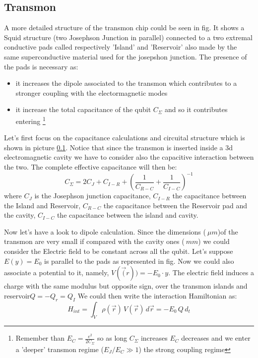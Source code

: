 \subsection{Transmon}
A more detailed structure of the transmon chip could be seen in fig. 
It shows a Squid structure (two Josephson Junction in parallel) connected to a two extremal conductive pads called respectively 'Island' and 'Reservoir' also made by the same superconductive material used for the josepshon junction. The presence of the pads is necessary as:
\begin{itemize}
    \item it increases the dipole associated to the transmon which contributes to a stronger coupling with the electormagnetic modes
    \item it increase the total capacitance of the qubit $C_{\Sigma}$ and so it contributes entering \footnote{Remember than $E_C = \frac{e^2}{2C_{\Sigma}}$ so as long $C_{\Sigma}$ increases $E_C$ decreases and we enter a 'deeper' transmon regime ($E_J/E_C \gg 1$) the strong coupling regime}
\end{itemize}
Let's first focus on the capacitance calculations and circuital structure which is shown in picture \ref{}. Notice that since the transmon is inserted inside a 3d electromagnetic cavity we have to consider also the capacitive interaction between the two. The complete effective capacitance will then be:
\begin{equation}
C_{\Sigma} = 2C_J + C_{I-R} + \left(\frac{1}{C_{R-C}} + \frac{1}{C_{I-C}}\right)^{-1}
\end{equation}
where $C_J$ is the Josephson junction capacitance, $C_{I-R}$ the capacitance between the Island and Reservoir, $C_{R-C}$ the capacitance between the Reservoir pad and the cavity, $C_{I-C}$ the capacitance between the island and cavity.\\
\par
Now let's have a look to dipole calculation. Since the dimensions ($~\mu m$)of the transmon are very small if compared with the cavity ones ($~mm$) we could consider the Electric field to be constant across all the qubit. Let's suppose $E(y) = E_0$ is parallel to the pads as represented in fig. Now we could also associate a potential to it, namely, $V(\vec(r)) = -E_0\cdot y$. The electric field induces a charge with the same modulus but opposite sign, over the transmon islands and reservoir$Q = - Q_{r} = Q_I$ We could then write the interaction Hamiltonian as:
\begin{equation}
    H_{int} = \int_{V} \rho(\vec{r})\,V(\vec{r})\,d\vec{r} = -E_0\, Q\, d_{t}
\end{equation}
